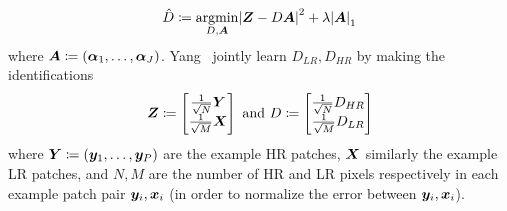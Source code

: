 \begin{equation}
    \hat{D} \coloneqq \underset{D, \bm{A}}{\text{argmin}} \abs{ \bm{Z} - D\bm{A} }^2 + \lambda \abs{ \bm{A} }_1
\end{equation}
where \(\bm{A} \coloneqq \left( \bm{\alpha}_1, \mathellipsis, \bm{\alpha}_J  \right)\).
%
Yang \etal~jointly learn \(D_{LR}, D_{HR}\) by making the identifications
\begin{equation*}
    \bm{Z} \coloneqq \begin{bmatrix}
        \frac{1}{\sqrt{N}}\bm{Y} \\ \frac{1}{\sqrt{M}} \bm{X}
    \end{bmatrix} \text{ and }
    D \coloneqq \begin{bmatrix}
        \frac{1}{\sqrt{N}} D_{HR} \\ \frac{1}{\sqrt{M}} D_{LR}
    \end{bmatrix}
\end{equation*}
where \(\bm{Y} \coloneqq \left( \bm{y}_1, \mathellipsis, \bm{y}_P \right)\) are the example HR patches, \(\bm{X}\) similarly the example LR patches, and \(N, M\) are the number of HR and LR pixels respectively in each example patch pair \(\bm{y}_i, \bm{x}_i\) (in order to normalize the error between \(\bm{y}_i, \bm{x}_i\)).

